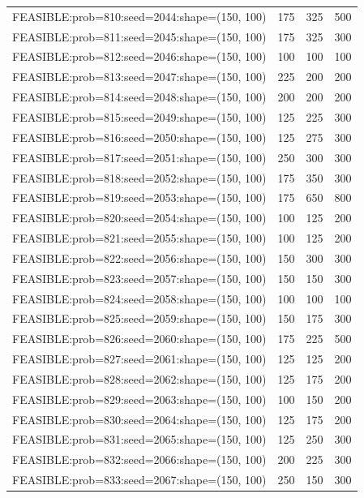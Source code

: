 \begin{longtable}{lccc}
FEASIBLE:prob=810:seed=2044:shape=(150, 100) &  175 &   325 &    500 \\
FEASIBLE:prob=811:seed=2045:shape=(150, 100) &  175 &   325 &    300 \\
FEASIBLE:prob=812:seed=2046:shape=(150, 100) &  100 &   100 &    100 \\
FEASIBLE:prob=813:seed=2047:shape=(150, 100) &  225 &   200 &    200 \\
FEASIBLE:prob=814:seed=2048:shape=(150, 100) &  200 &   200 &    200 \\
FEASIBLE:prob=815:seed=2049:shape=(150, 100) &  125 &   225 &    300 \\
FEASIBLE:prob=816:seed=2050:shape=(150, 100) &  125 &   275 &    300 \\
FEASIBLE:prob=817:seed=2051:shape=(150, 100) &  250 &   300 &    300 \\
FEASIBLE:prob=818:seed=2052:shape=(150, 100) &  175 &   350 &    300 \\
FEASIBLE:prob=819:seed=2053:shape=(150, 100) &  175 &   650 &    800 \\
FEASIBLE:prob=820:seed=2054:shape=(150, 100) &  100 &   125 &    200 \\
FEASIBLE:prob=821:seed=2055:shape=(150, 100) &  100 &   125 &    200 \\
FEASIBLE:prob=822:seed=2056:shape=(150, 100) &  150 &   300 &    300 \\
FEASIBLE:prob=823:seed=2057:shape=(150, 100) &  150 &   150 &    300 \\
FEASIBLE:prob=824:seed=2058:shape=(150, 100) &  100 &   100 &    100 \\
FEASIBLE:prob=825:seed=2059:shape=(150, 100) &  150 &   175 &    300 \\
FEASIBLE:prob=826:seed=2060:shape=(150, 100) &  175 &   225 &    500 \\
FEASIBLE:prob=827:seed=2061:shape=(150, 100) &  125 &   125 &    200 \\
FEASIBLE:prob=828:seed=2062:shape=(150, 100) &  125 &   175 &    200 \\
FEASIBLE:prob=829:seed=2063:shape=(150, 100) &  100 &   150 &    200 \\
FEASIBLE:prob=830:seed=2064:shape=(150, 100) &  125 &   175 &    200 \\
FEASIBLE:prob=831:seed=2065:shape=(150, 100) &  125 &   250 &    300 \\
FEASIBLE:prob=832:seed=2066:shape=(150, 100) &  200 &   225 &    300 \\
FEASIBLE:prob=833:seed=2067:shape=(150, 100) &  250 &   150 &    300 \\

\end{longtable}
